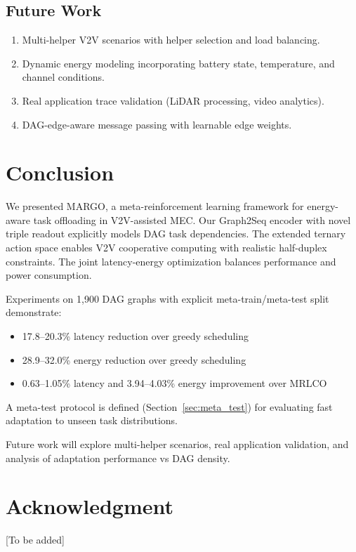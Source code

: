 \documentclass[journal,twoside]{IEEEtran}
\newcommand{\method}{\textsc{MARGO}}
\newcommand{\baseline}{\textsc{MRLCO}}
\begin{document}
\subsection{Future Work}

\begin{enumerate}
    \item Multi-helper V2V scenarios with helper selection and load balancing.
    \item Dynamic energy modeling incorporating battery state, temperature, and channel conditions.
    \item Real application trace validation (LiDAR processing, video analytics).
    \item DAG-edge-aware message passing with learnable edge weights.
\end{enumerate}

    \section{Conclusion}
    \label{sec:conclusion}

We presented \method{}, a meta-reinforcement learning framework for energy-aware task offloading in V2V-assisted MEC. Our Graph2Seq encoder with novel triple readout explicitly models DAG task dependencies. The extended ternary action space enables V2V cooperative computing with realistic half-duplex constraints. The joint latency-energy optimization balances performance and power consumption.

Experiments on 1,900 DAG graphs with explicit meta-train/meta-test split demonstrate:
\begin{itemize}
    \item 17.8--20.3\% latency reduction over greedy scheduling
    \item 28.9--32.0\% energy reduction over greedy scheduling
    \item 0.63--1.05\% latency and 3.94--4.03\% energy improvement over \baseline{}
\end{itemize}
A meta-test protocol is defined (Section~\ref{sec:meta_test}) for evaluating fast adaptation to unseen task distributions.

Future work will explore multi-helper scenarios, real application validation, and analysis of adaptation performance vs DAG density.

    \section*{Acknowledgment}
[To be added]

    
    

    
\end{document}

